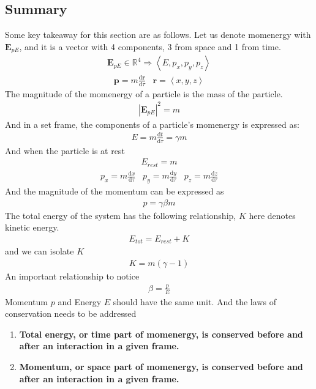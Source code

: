 \documentclass[12pt]{book}
\newcommand{\R}{\mathbb{R}}
\newcommand{\dydx}[2]{\frac{\text{d} #1}{\text{d} #2}}
\newcommand{\tribkt}[1]{\left< #1 \right>}
\newcommand{\abso}[1]{\left|#1 \right|}
\begin{document}
\subsection{Summary}
Some key takeaway for this section are as follows. Let us denote momenergy with $\textbf{E}_{pE}$, and it is a vector with 4 components, 3 from space and 1 from time. 
\begin{align}
\textbf{E}_{pE} \in \R ^4 \Rightarrow \tribkt{E,p_x,p_y,p_z}
\end{align}
\begin{align}
\textbf{p} = m\dydx{\textbf{r}}{\tau} \;\;\; \textbf{r} = \tribkt{x,y,z}
\end{align}
The magnitude of the momenergy of a particle is the mass of the particle. 
\begin{align}
\abso{\textbf{E}_{pE}}^2 = m
\end{align}
And in a set frame, the components of a particle's momenergy is expressed as:
\begin{align}
E = m\dydx{t}{\tau} = \gamma m
\end{align}
And when the particle is at rest
\begin{align}
E_{rest} = m
\end{align}
\begin{align}
p_x = m\dydx{x}{\tau}\;\;\; p_y = m\dydx{y}{\tau}\;\;\; p_z = m\dydx{z}{\tau}
\end{align}
And the magnitude of the momentum can be expressed as
\begin{align}
p = \gamma \beta m
\end{align}
The total energy of the system has the following relationship, $K$ here denotes kinetic energy.
\begin{align}
E_{tot}=E_{rest} + K
\end{align}
and we can isolate $K$
\begin{align}
K = m(\gamma -1)
\end{align}
An important relationship to notice
\begin{align}
\beta = \frac{p}{E}
\end{align}
 Momentum $p$ and Energy $E$ should have the same unit.
\newpage
And the laws of conservation needs to be addressed
\begin{enumerate}
    \item \textbf{Total energy, or time part of momenergy, is conserved before and after an interaction in a given frame.}
    \item \textbf{Momentum, or space part of momenergy, is conserved before and after an interaction in a given frame. }
\end{enumerate}
\end{document}
